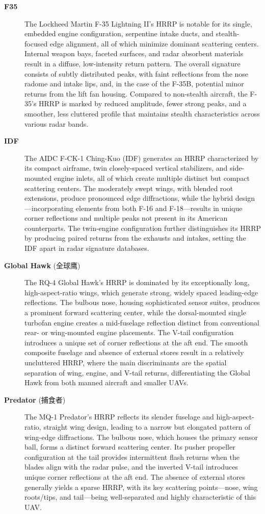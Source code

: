 {\begin{description}
    \item[\textbf{F35}]
    The Lockheed Martin F-35 Lightning II's HRRP is notable for its single, embedded engine configuration, serpentine intake ducts, and stealth-focused edge alignment, all of which minimize dominant scattering centers. Internal weapon bays, faceted surfaces, and radar absorbent materials result in a diffuse, low-intensity return pattern. The overall signature consists of subtly distributed peaks, with faint reflections from the nose radome and intake lips, and, in the case of the F-35B, potential minor returns from the lift fan housing. Compared to non-stealth aircraft, the F-35's HRRP is marked by reduced amplitude, fewer strong peaks, and a smoother, less cluttered profile that maintains stealth characteristics across various radar bands.

    \item[\textbf{IDF}]
    The AIDC F-CK-1 Ching-Kuo (IDF) generates an HRRP characterized by its compact airframe, twin closely-spaced vertical stabilizers, and side-mounted engine inlets, all of which create multiple distinct but compact scattering centers. The moderately swept wings, with blended root extensions, produce pronounced edge diffractions, while the hybrid design—incorporating elements from both F-16 and F-18—results in unique corner reflections and multiple peaks not present in its American counterparts. The twin-engine configuration further distinguishes its HRRP by producing paired returns from the exhausts and intakes, setting the IDF apart in radar signature databases.

    \item[\textbf{Global Hawk} (全球鹰)]
    The RQ-4 Global Hawk's HRRP is dominated by its exceptionally long, high-aspect-ratio wings, which generate strong, widely spaced leading-edge reflections. The bulbous nose, housing sophisticated sensor suites, produces a prominent forward scattering center, while the dorsal-mounted single turbofan engine creates a mid-fuselage reflection distinct from conventional rear- or wing-mounted engine placements. The V-tail configuration introduces a unique set of corner reflections at the aft end. The smooth composite fuselage and absence of external stores result in a relatively uncluttered HRRP, where the main discriminants are the spatial separation of wing, engine, and V-tail returns, differentiating the Global Hawk from both manned aircraft and smaller UAVs.

    \item[\textbf{Predator} (捕食者)]
    The MQ-1 Predator's HRRP reflects its slender fuselage and high-aspect-ratio, straight wing design, leading to a narrow but elongated pattern of wing-edge diffractions. The bulbous nose, which houses the primary sensor ball, forms a distinct forward scattering center. Its pusher propeller configuration at the tail provides intermittent flash returns when the blades align with the radar pulse, and the inverted V-tail introduces unique corner reflections at the aft end. The absence of external stores generally yields a sparse HRRP, with its key scattering points—nose, wing roots/tips, and tail—being well-separated and highly characteristic of this UAV.


\end{description}}
